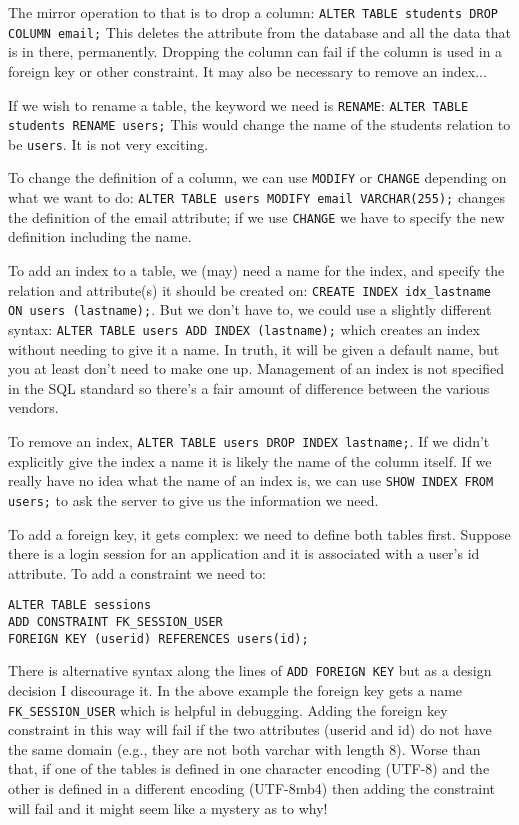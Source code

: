 \documentclass[a4paper]{report}
\begin{document}
The mirror operation to that is to drop a column: \texttt{ALTER TABLE students DROP COLUMN email;} This deletes the attribute from the database and all the data that is in there, permanently. Dropping the column can fail if the column is used in a foreign key or other constraint. It may also be necessary to remove an index... 

If we wish to rename a table, the keyword we need is \texttt{RENAME}: \texttt{ALTER TABLE students RENAME users;} This would change the name of the students relation to be \texttt{users}. It is not very exciting.

To change the definition of a column, we can use \texttt{MODIFY} or \texttt{CHANGE} depending on what we want to do: \texttt{ALTER TABLE users MODIFY email VARCHAR(255);} changes the definition of the email attribute; if we use \texttt{CHANGE} we have to specify the new definition including the name.

To add an index to a table, we (may) need a name for the index, and specify the relation and attribute(s) it should be created on: \texttt{CREATE INDEX idx\_lastname ON users (lastname);}. But we don't have to, we could use a slightly different syntax: \texttt{ALTER TABLE users ADD INDEX (lastname);} which creates an index without needing to give it a name. In truth, it will be given a default name, but you at least don't need to make one up. Management of an index is not specified in the SQL standard so there's a fair amount of difference between the various vendors.

To remove an index, \texttt{ALTER TABLE users DROP INDEX lastname;}. If we didn't explicitly give the index a name it is likely the name of the column itself. If we really have no idea what the name of an index is, we can use \texttt{SHOW INDEX FROM users;} to ask the server to give us the information we need.

To add a foreign key, it gets complex: we need to define both tables first. Suppose there is a login session for an application and it is associated with a user's id attribute. To add a constraint we need to:

\begin{verbatim}
ALTER TABLE sessions
ADD CONSTRAINT FK_SESSION_USER
FOREIGN KEY (userid) REFERENCES users(id);
\end{verbatim}

There is alternative syntax along the lines of \texttt{ADD FOREIGN KEY} but as a design decision I discourage it. In the above example the foreign key gets a name \texttt{FK\_SESSION\_USER} which is helpful in debugging. Adding the foreign key constraint in this way will fail if the two attributes (userid and id) do not have the same domain (e.g., they are not both varchar with length 8). Worse than that, if one of the tables is defined in one character encoding (UTF-8) and the other is defined in a different encoding (UTF-8mb4) then adding the constraint will fail and it might seem like a mystery as to why!
\end{document}
